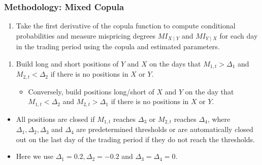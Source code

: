 \documentclass[pdf,9pt,xcolor=dvipsnames,hide notes]{beamer}
\begin{document}
\begin{frame}
\frametitle{Methodology: Mixed Copula}

	\begin{enumerate}[(3)]
	\justifying
		
		\item Take the first derivative of the copula function to compute conditional
		probabilities and measure mispricing degrees $MI_{X\mid Y}$ and $MI_{Y\mid X}$ for each day in the trading period using the copula and estimated parameters.
		
		\vspace{0.3cm}
		
	\end{enumerate}

	\begin{enumerate}[(4)]
	\justifying
		
		\item Build long and short positions of $Y$ and $X$ on the days that $M_{1,t}>\Delta_{1}$ and $M_{2,t}<\Delta_{2}$ if there is no positions in $X$ or $Y$. 
		
		\vspace{0.1cm}
		\begin{itemize}
			\item Conversely, build positions long/short of $X$ and $Y$ on the day that $M_{1,t}<\Delta_{2}$ and $M_{2,t}>\Delta_{1}$ if there is no positions in $X$ or $Y$.
		\end{itemize}
		
	\end{enumerate}

		\begin{itemize}
	\item  All positions are closed if $M_{1,t}$ reaches $\Delta_{3}$ or $M_{2,t}$ reaches $\Delta_{4}$, where $\Delta_{1},\Delta_{2},\Delta_{3}$ and $\Delta_{4}$ are predetermined thresholds or are automatically closed out on the last day of the trading period if they do not reach the thresholds. 
	
	\vspace{0.3cm}
	
	\item Here we use $\Delta_{1}=0.2, \Delta_{2}=-0.2$ and $\Delta_{3}=\Delta_{4}=0$.
	
	\end{itemize}
	
\end{frame}
\end{document}
